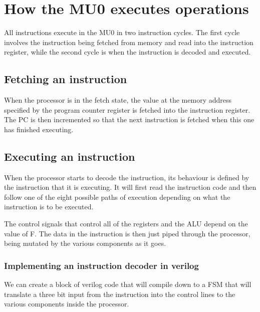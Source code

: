 \documentclass{article}
\begin{document}
\section{How the MU0 executes operations}

All instructions execute in the MU0 in two instruction cycles. The first cycle
involves the instruction being fetched from memory and read into the instruction
register, while the second cycle is when the instruction is decoded and
executed.

\subsection{Fetching an instruction}

When the processor is in the fetch state, the value at the memory address
specified by the program counter register is fetched into the instruction
register. The PC is then incremented so that the next instruction is fetched
when this one has finished executing.


\subsection{Executing an instruction}

When the processor starts to decode the instruction, its behaviour is defined by
the instruction that it is executing. It will first read the instruction code
and then follow one of the eight possible paths of execution depending on what
the instruction is to be executed.

The control signals that control all of the registers and the ALU depend on the
value of F. The data in the instruction is then just piped through the
processor, being mutated by the various components as it goes.

\subsubsection{Implementing an instruction decoder in verilog}

We can create a block of verilog code that will compile down to a FSM that will
translate a three bit input from the instruction into the control lines to the
various components inside the processor.
\end{document}

